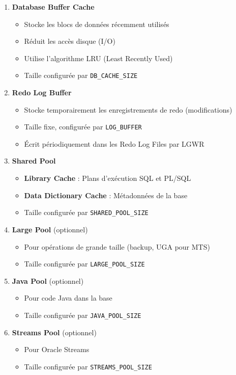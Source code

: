\documentclass[11pt,a4paper]{article}
\begin{document}
\begin{enumerate}
    \item \textbf{Database Buffer Cache}
    \begin{itemize}
        \item Stocke les blocs de données récemment utilisés
        \item Réduit les accès disque (I/O)
        \item Utilise l'algorithme LRU (Least Recently Used)
        \item Taille configurée par \texttt{DB\_CACHE\_SIZE}
    \end{itemize}
    
    \item \textbf{Redo Log Buffer}
    \begin{itemize}
        \item Stocke temporairement les enregistrements de redo (modifications)
        \item Taille fixe, configurée par \texttt{LOG\_BUFFER}
        \item Écrit périodiquement dans les Redo Log Files par LGWR
    \end{itemize}
    
    \item \textbf{Shared Pool}
    \begin{itemize}
        \item \textbf{Library Cache} : Plans d'exécution SQL et PL/SQL
        \item \textbf{Data Dictionary Cache} : Métadonnées de la base
        \item Taille configurée par \texttt{SHARED\_POOL\_SIZE}
    \end{itemize}
    
    \item \textbf{Large Pool} (optionnel)
    \begin{itemize}
        \item Pour opérations de grande taille (backup, UGA pour MTS)
        \item Taille configurée par \texttt{LARGE\_POOL\_SIZE}
    \end{itemize}
    
    \item \textbf{Java Pool} (optionnel)
    \begin{itemize}
        \item Pour code Java dans la base
        \item Taille configurée par \texttt{JAVA\_POOL\_SIZE}
    \end{itemize}
    
    \item \textbf{Streams Pool} (optionnel)
    \begin{itemize}
        \item Pour Oracle Streams
        \item Taille configurée par \texttt{STREAMS\_POOL\_SIZE}
    \end{itemize}
\end{enumerate}
\end{document}
